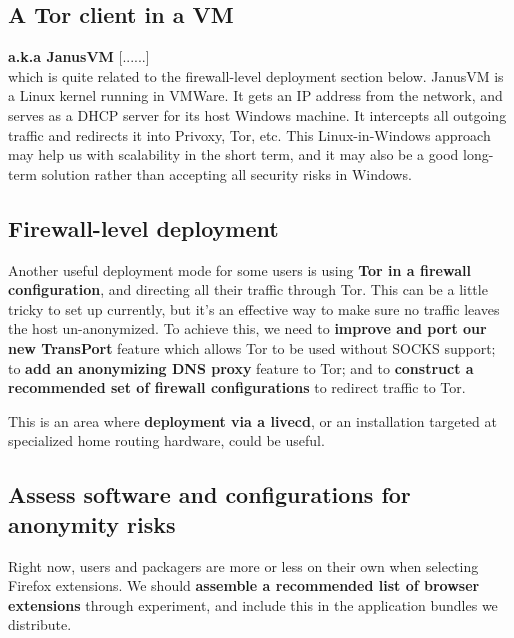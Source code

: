 \documentclass{article}
\newcommand{\tmp}[1]{{\bf #1} [......] \\}
\begin{document}
\subsection{A Tor client in a VM}
\tmp{a.k.a JanusVM} which is quite related to the firewall-level deployment
section below. JanusVM is a Linux kernel running in VMWare. It gets an IP
address from the network, and serves as a DHCP server for its host Windows
machine. It intercepts all outgoing traffic and redirects it into Privoxy,
Tor, etc. This Linux-in-Windows approach may help us with scalability in
the short term, and it may also be a good long-term solution rather than
accepting all security risks in Windows.


\subsection{Firewall-level deployment}
Another useful deployment mode for some users is using {\bf Tor in a firewall
  configuration}, and directing all their traffic through Tor.  This can be a
little tricky to set up currently, but it's an effective way to make sure no
traffic leaves the host un-anonymized.  To achieve this, we need to {\bf
  improve and port our new TransPort} feature which allows Tor to be used
without SOCKS support; to {\bf add an anonymizing DNS proxy} feature to Tor;
and to {\bf construct a recommended set of firewall configurations} to redirect
traffic to Tor.

This is an area where {\bf deployment via a livecd}, or an installation
targeted at specialized home routing hardware, could be useful.

\subsection{Assess software and configurations for anonymity risks}
Right now, users and packagers are more or less on their own when selecting
Firefox extensions.  We should {\bf assemble a recommended list of browser
  extensions} through experiment, and include this in the application bundles
we distribute.
\end{document}
